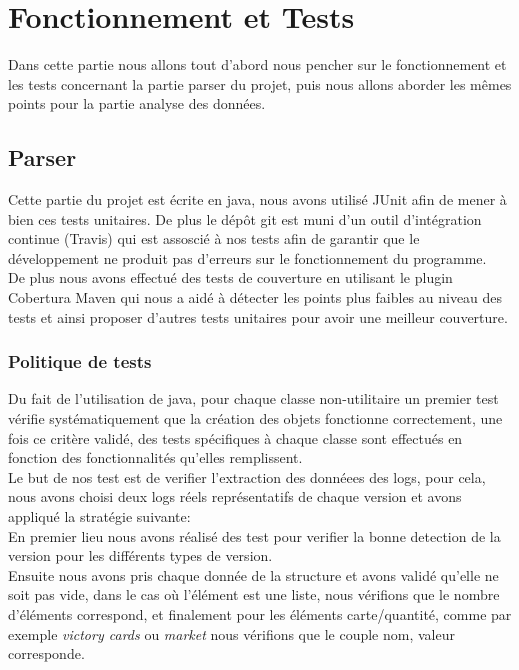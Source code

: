 \chapter{Fonctionnement et Tests}

Dans cette partie nous allons tout d'abord nous pencher sur le fonctionnement et les tests concernant la partie parser du projet, puis nous allons aborder les mêmes points pour la partie analyse des données.

\section{Parser}

Cette partie du projet est écrite en java, nous avons utilisé JUnit afin de mener à bien ces tests unitaires. De plus le dépôt git est muni d'un outil d'intégration continue (Travis) qui est assoscié à nos tests afin de garantir que le développement ne produit pas d'erreurs sur le fonctionnement du programme. \\

De plus nous avons effectué des tests de couverture en utilisant le plugin Cobertura Maven qui nous a aidé à détecter les points plus faibles au niveau des tests et ainsi proposer d'autres tests unitaires pour avoir une meilleur couverture.


\subsection{Politique de tests}

Du fait de l'utilisation de java, pour chaque classe non-utilitaire un premier test vérifie systématiquement que la création des objets fonctionne correctement, une fois ce critère validé, des tests spécifiques à chaque classe sont effectués en fonction des fonctionnalités qu'elles remplissent.\\

Le but de nos test est de verifier l'extraction des donnéees des logs, pour cela, nous avons choisi deux logs réels représentatifs de chaque version et avons appliqué la stratégie suivante:  \\
En premier lieu nous avons réalisé des test pour verifier la bonne detection de la version pour les différents types de version. \\
Ensuite nous avons pris chaque donnée de la structure et avons validé qu'elle ne soit pas vide, dans le cas où l'élément est une liste, nous vérifions que le nombre d'éléments correspond, et finalement pour les éléments carte/quantité, comme par exemple \textit{victory cards} ou \textit{market} nous vérifions que le couple nom, valeur corresponde.

